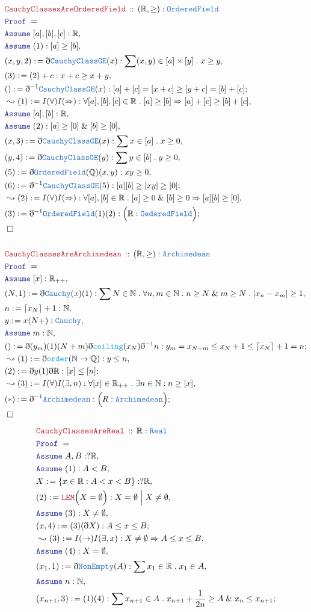 \documentclass[12pt]{scrartcl}
\newcommand{\TYPE}[1]{\textcolor{NavyBlue}{\mathtt{#1}}}
\newcommand{\FUNC}[1]{\textcolor{Cerulean}{\mathtt{#1}}}
\newcommand{\LOGIC}[1]{\textcolor{Blue}{\mathtt{#1}}}
\newcommand{\THM}[1]{\textcolor{Maroon}{\mathtt{#1}}}
\renewcommand{\.}{\; . \;}
\newcommand{\de}{: \kern 0.1pc =}
\newcommand{\Theorem}[2]{& \THM{#1} \, :: \, #2 \\ & \Proof = \\ }
\newcommand{\Page}[1]{ \begin{align*} #1 \end{align*}   }
\newcommand{ \bd }{ \ByDef }
\renewcommand{\And}{\; \& \;}
\newcommand{\Reals}{\mathbb{R} }
\newcommand{\Rats}{\mathbb{Q} }
\newcommand{\Nat}{\mathbb{N} }
\newcommand{\Say}[3]{& #1 \de #2 : #3, \\}
\newcommand{\Conclude}[3]{& #1 \de #2 : #3; \\}
\newcommand{\Derive}[3]{& \leadsto #1 \de #2 : #3, \\}
\newcommand{\Assume}[2]{& \LOGIC{Assume} \;#1 : #2, \\}
\newcommand{\QED}{\; \square}
\newcommand{\EndProof}{& \QED \\}
\newcommand{\ByDef}{\eth}
\newcommand{\Proof}{\LOGIC{Proof} \; }
\begin{document}
\Page{
	\Theorem{CauchyClassesAreOrderedField}{(\Reals,\ge) : \TYPE{OrderedField}}
	\Assume{[a],[b],[c]}{ \Reals }
	\Assume{(1)}{[a] \ge [b]}
	\Say{(x,y,2)}{ \bd \TYPE{CauchyClassGE}(x)  }{  \sum (x,y) \in [a] \times [y] \. 
		  x \ge y     }
	\Say{(3)}{ (2) + c }{ x + c \ge x + y  }
	\Conclude{()}{\bd^{-1} \TYPE{CauchyClassGE}(x) }{  [a] + [c] = [x + c] \ge [y + c] =  [b] + [c] }
	\Derive{(1)}{I(\forall)I(\Rightarrow)}{ \forall [a],[b],[c] \in \Reals \.  
	   [a] \ge [b] \Rightarrow   [a] + [c] \ge [b] + [c] }
	\Assume{[a],[b]}{ \Reals   }
	\Assume{(2)}{ [a] \ge [0] \And [b] \ge [0] }
	\Say{(x, 3)}{ \bd \TYPE{CauchyClassGE}(x)  }{\sum x \in [a] \. x \ge 0}
	\Say{(y,4)}{  \bd \TYPE{CauchyClassGE}(y)   }{ \sum y \in [b] \. y \ge 0}
	\Say{(5)}{  \bd \TYPE{OrderedField}(\Rats)(x,y) }{  xy \ge 0  }
	\Conclude{(6)}{ \bd^{-1} \TYPE{CauchyClassGE}(5)    }{ [a][b] \ge [xy] \ge [0]  }
	\Derive{(2)}{ I(\forall)I(\Rightarrow) }{  \forall [a],[b] \in \Reals \. [a] \ge 0 \And [b] \ge 0  
	  \Rightarrow  [a][b] \ge [0]  } 
	\Conclude{(3)}{ \bd^{-1} \TYPE{OrderedField}(1)(2) }{ \Big( \Reals : \TYPE{OederedField} \Big)    }
	\EndProof
	\\
	\Theorem{CauchyClassesAreArchimedean}{ (\Reals,\ge) : \TYPE{Archimedean} }
	\Assume{[x]}{\Reals_{++}}
	\Say{(N,1)}{ \bd \TYPE{Cauchy}(x)(1)}{ \sum N \in \Nat \. \forall n,m \in \Nat \. 
             n \ge N \And m \ge N \.  |x_n - x_m| \ge 1	 }
	\Say{n}{ \lceil x_N \rceil + 1 }{\Nat}
	\Say{y}{x(N+)}{ \TYPE{Cauchy}  }
	\Assume{m}{\Nat}
	\Conclude{()}{ \bd(y_m)(1)(N + m)\bd \FUNC{ceiling}(x_N)\bd^{-1}n   }
	{ y_m = x_{N + m} \le x_N + 1 \le \lceil x_N \rceil + 1 = n }
	\Derive{(1)}{\bd \FUNC{order}(\Nat \to \Rats)}{ y \le n }
	\Conclude{(2)}{\bd y (1) \bd \Reals }{ [x] \le [n]}
	\Derive{(3)}{ I(\forall) I(\exists,n)}{ \forall [x] \in \Reals_{++} \. \exists n \in \Nat : n \ge [x]  }
	\Conclude{(*)}{ \bd^{-1}\TYPE{Archimedean} }{  \Big( R : \TYPE{Archimedean} \Big)  }
 	\EndProof
 }\Page{
	\Theorem{CauchyClassesAreReal}{ \Reals : \TYPE{Real}    }
	\Assume{ A,B}{?\Reals}
	\Assume{(1)}{ A < B  }
	\Say{X}{\{ x \in \Reals : A < x < B  \}}{?\Reals}
	\Say{(2)}{ \THM{LEM}\Big(X = \emptyset\Big)  }{ X = \emptyset \; \Big| \; X \neq \emptyset}
	\Assume{(3)}{X \neq \emptyset }
	\Conclude{(x,4)}{ (3)(\bd X) }{ A \le x \le B }
	\Derive{(3)}{I(\rightarrow)I(\exists,x)}{X \neq \emptyset \Rightarrow  A \le x \le B   }
	\Assume{(4)}{X = \emptyset}
	\Say{(x_1,1)}{\bd \TYPE{NonEmpty}(A)}{\sum x_1 \in \Reals \. x_1 \in A }
	\Assume{n}{\Nat}
	\Conclude{(x_{n+1},3)}{(1)(4)}{ \sum x_{n + 1} \in A \. x_{n + 1}  + \frac{1}{2n} \ge A \And x_n \le x_{n+1} }
}
\end{document}
